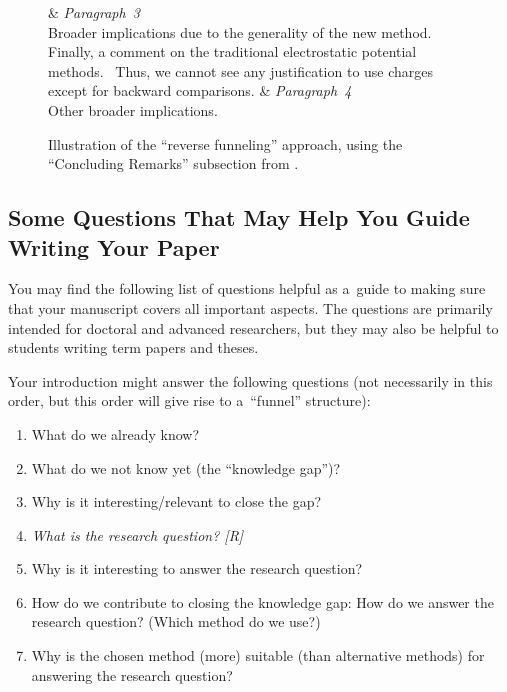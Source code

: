 \begin{figure}[p]
\begin{tblr}{}
		&
		{%
			\textit{Paragraph~3} \\
			Broader implications due to the generality of the new method.
		}
		\\
		\hspace{\baselineskip}Finally, a comment on the traditional electrostatic potential methods. \textellipsis\ Thus, we cannot see any justification to use  charges except for backward comparisons.
		&
		{%
			\textit{Paragraph~4} \\
			Other broader implications.
		}
	\end{tblr}%
	\caption{%
		Illustration of the ``reverse funneling'' approach, using the ``Concluding Remarks'' subsection from \citet{sigfridsson}.
	}
	\label{fig:sigfridsson:conclusion}
\end{figure}

\endgroup

\subsection{Some Questions That May Help You Guide Writing Your Paper}

You may find the following list of questions helpful as a~guide to making sure that your manu\-script covers all important aspects. The questions are primarily intended for doctoral and advanced researchers, but they may also be helpful to students writing term papers and theses.

Your introduction might answer the following questions (not necessarily in this order, but this order will give rise to a~``funnel'' structure):
\begin{enumerate}[labelindent = \parindent, leftmargin = 2\parindent]
	\item What do we already know?
	\item What do we not know yet (the ``knowledge gap'')?
	\item Why is it interesting\slash relevant to close the gap?
	\item \emph{What is the research question? [R]}
	\item Why is it interesting to answer the research question?
	\item How do we contribute to closing the knowledge gap: How do we answer the research question? (Which method do we use?)
	\item Why is the chosen method (more) suitable (than alternative methods) for answering the research question?
\end{enumerate}

